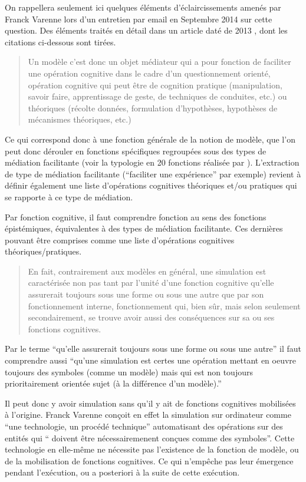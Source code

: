 On rappellera seulement ici quelques éléments d'éclaircissements amenés par Franck Varenne lors d'un entretien par email en Septembre 2014 sur cette question. Des éléments traités en détail dans un article daté de 2013 \autocite{Varenne2013b}, dont les citations ci-dessous sont tirées.

\blockquote[\cite{Varenne2013b}]{Un modèle c'est donc un objet médiateur qui a pour fonction de faciliter une opération cognitive dans le cadre d'un questionnement orienté, opération cognitive qui peut être de cognition pratique (manipulation, savoir­ faire, apprentissage de geste, de techniques de conduites, etc.) ou théoriques (récolte données, formulation d'hypothèses, hypothèses de mécanismes théoriques, etc.)}

Ce qui correspond donc à une fonction générale de la notion de modèle, que l'on peut donc dérouler en fonctions spécifiques regroupées sous des types de médiation facilitante (voir la typologie en 20 fonctions réalisée par \textcite{Varenne2013b}). L'extraction de type de médiation facilitante (\enquote{faciliter une expérience} par exemple) revient à définir également une liste d'opérations cognitives théoriques et/ou pratiques qui se rapporte à ce type de médiation.

Par fonction cognitive, il faut comprendre fonction au sens des fonctions épistémiques, équivalentes à des types de médiation facilitante. Ces dernières pouvant être comprises comme une liste d'opérations cognitives théoriques/pratiques.

\blockquote[\cite{Varenne2013b}]{En fait, contrairement aux modèles en général, une simulation est caractérisée non pas tant par l'unité d'une fonction cognitive qu'elle assurerait toujours sous une forme ou sous une autre que par son fonctionnement interne, fonctionnement qui, bien sûr, mais selon seulement secondairement, se trouve avoir aussi des conséquences sur sa ou ses fonctions cognitives.}

Par le terme \enquote{qu'elle assurerait toujours sous une forme ou sous une autre} il faut comprendre aussi \enquote{qu'une simulation est certes une opération mettant en oeuvre toujours des symboles (comme un modèle) mais qui est non toujours prioritairement orientée sujet (à la différence d'un modèle).}

Il peut donc y avoir simulation sans qu'il y ait de fonctions cognitives mobilisées à l'origine. Franck Varenne conçoit en effet la simulation sur ordinateur comme \enquote{une technologie, un procédé technique} automatisant des opérations sur des entités qui \enquote{ doivent être nécessairemenent conçues comme des symboles}. Cette technologie en elle-même ne nécessite pas l'existence de la fonction de modèle, ou de la mobilisation de fonctions cognitives. Ce qui n'empêche pas leur émergence pendant l'exécution, ou a posteriori à la suite de cette exécution.

